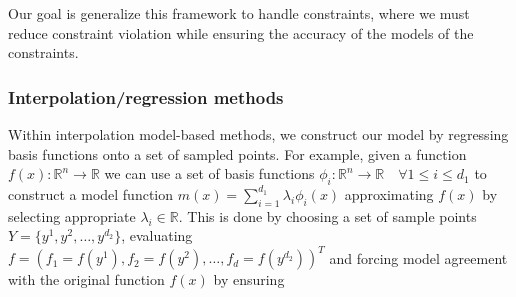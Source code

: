 \documentclass{article}
\begin{document}
Our goal is generalize this framework to handle constraints, where we must reduce constraint violation while ensuring the accuracy of the models of the constraints.

  


\subsubsection{Interpolation/regression methods}

Within interpolation model-based methods, we construct our model by regressing basis functions onto a set of sampled points.
For example, given a function $f(x) : \mathbb R^n \to \mathbb R$ we can use a set of basis functions $\phi_i : \mathbb R^n \to \mathbb R \quad \forall 1 \le i \le d_1$ to construct a model function $m(x) = \sum_{i=1}^{d_1} \lambda_i \phi_i(x)$ approximating $f(x)$ by selecting appropriate $\lambda_i \in \mathbb R$.
This is done by choosing a set of sample points
$Y = \{y^1, y^2, \ldots, y^{d_2}\}$,
evaluating $f = (f_1 = f(y^1), f_2 = f(y^2), \ldots, f_d = f(y^{d_2}))^T$
and forcing model agreement with the original function $f(x)$ by ensuring
\end{document}
